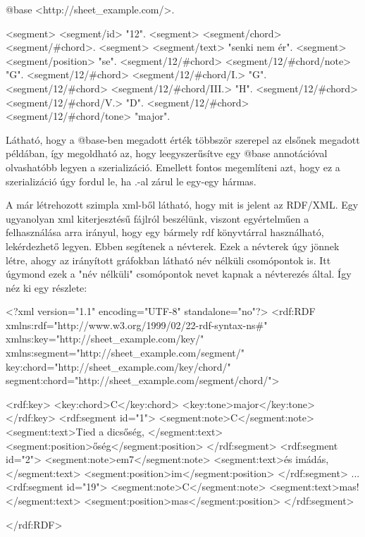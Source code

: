 \begin{xml}
@base <http://sheet_example.com/>.

<segment> <segment/id> "12".
<segment> <segment/chord> <segment/#chord>.
<segment> <segment/text> "senki nem ér".
<segment> <segment/position> "se".
<segment/12/#chord> <segment/12/#chord/note> "G".
<segment/12/#chord> <segment/12/#chord/I.> "G".
<segment/12/#chord> <segment/12/#chord/III.> "H".
<segment/12/#chord> <segment/12/#chord/V.> "D".
<segment/12/#chord> <segment/12/#chord/tone> "major".
\end{xml}

Látható, hogy a @base-ben megadott érték többször szerepel az elsőnek megadott példában, így megoldható az, hogy leegyszerűsítve egy @base annotációval olvashatóbb legyen a szerializáció. Emellett fontos megemlíteni azt, hogy ez a szerializáció úgy fordul le, ha .-al zárul le egy-egy hármas.

A már létrehozott szimpla xml-ből látható, hogy mit is jelent az RDF/XML. Egy ugyanolyan xml kiterjesztésű fájlról beszélünk, viszont egyértelműen a felhasználása arra irányul, hogy egy bármely rdf könyvtárral használható, lekérdezhető legyen. Ebben segítenek a névterek. Ezek a névterek úgy jönnek létre, ahogy az irányított gráfokban látható név nélküli csomópontok is. Itt úgymond ezek a "név nélküli" csomópontok nevet kapnak a névterezés által.
Így néz ki egy részlete:

\begin{xml}
	<?xml version="1.1" encoding="UTF-8" standalone="no"?>
	<rdf:RDF 
			xmlns:rdf="http://www.w3.org/1999/02/22-rdf-syntax-ns#"
			xmlns:key="http://sheet_example.com/key/"
			xmlns:segment="http://sheet_example.com/segment/"
			key:chord="http://sheet_example.com/key/chord/"
			segment:chord="http://sheet_example.com/segment/chord/">
	
	    
	        <rdf:key>
	            <key:chord>C</key:chord>
	            <key:tone>major</key:tone>
	        </rdf:key>
	        <rdf:segment id="1">
	            <segment:note>C</segment:note>
	            <segment:text>Tied a dicsőség, </segment:text>
	            <segment:position>őség</segment:position>
	        </rdf:segment>
	        <rdf:segment id="2">
	            <segment:note>em7</segment:note>
	            <segment:text>és imádás,\n</segment:text>
	            <segment:position>im</segment:position>
	        </rdf:segment>
	        ...
	        <rdf:segment id="19">
	            <segment:note>C</segment:note>
	            <segment:text>mas!</segment:text>
	            <segment:position>mas</segment:position>
	        </rdf:segment>
	
	
	</rdf:RDF>
\end{xml}

